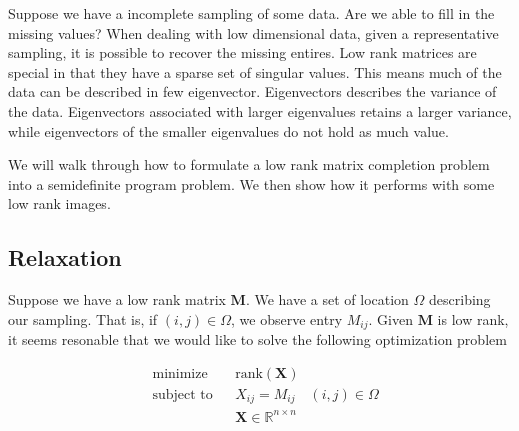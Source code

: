 \documentclass{article}
\begin{document}


Suppose we have a incomplete sampling of some data. Are we able to fill in the missing values? 
When dealing with low dimensional data, given a representative sampling, it is possible to recover the missing entires. 
Low rank matrices are special in that they have a sparse set of singular values. This means much 
of the data can be described in few eigenvector. 
Eigenvectors describes the variance of the data. Eigenvectors associated with larger eigenvalues 
retains a larger variance, while eigenvectors of the smaller eigenvalues do not hold as much value. 


We will walk through how to formulate a low rank matrix completion problem into a semidefinite program problem.
We then show how it performs with some low rank images. 

\subsection{Relaxation}

Suppose we have a low rank matrix $\mathbf{M}$. We have a set of location $\Omega$ describing
our sampling. That is, if $(i,j) \in \Omega$, we observe entry $M_{ij}$. Given $\mathbf{M}$ is low rank, 
it seems resonable that we would like to solve the following optimization problem

\begin{equation*}
  \begin{aligned}
  & {\text{minimize}}
  & & \text{rank}(\mathbf{X}) \\[1pt]
  & \text{subject to}
  & & X_{ij} = M_{ij} \quad (i,j) \in \Omega\\[1pt]
  &&& \mathbf{X} \in \mathbb{R}^{n \times n}
  \end{aligned}
\end{equation*}
\end{document}
